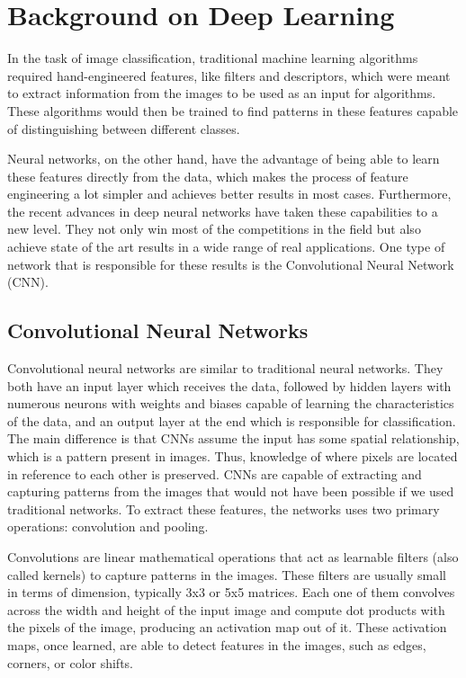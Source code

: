 \chapter{Background on Deep Learning}

In the task of image classification, traditional machine learning algorithms required hand-engineered features, like filters and descriptors, which were meant to extract information from the images to be used as an input for algorithms. These algorithms would then be trained to find patterns in these features capable of distinguishing between different classes.

Neural networks, on the other hand, have the advantage of being able to learn these features directly from the data, which makes the process of feature engineering a lot simpler and achieves better results in most cases. Furthermore, the recent advances in deep neural networks have taken these capabilities to a new level. They not only win most of the competitions in the field but also achieve state of the art results in a wide range of real applications. One type of network that is responsible for these results is the Convolutional Neural Network (CNN).

\section{Convolutional Neural Networks}

Convolutional neural networks are similar to traditional neural networks. They both have an input layer which receives the data, followed by hidden layers with numerous neurons with weights and biases capable of learning the characteristics of the data, and an output layer at the end which is responsible for classification. The main difference is that CNNs assume the input has some spatial relationship, which is a pattern present in images. Thus, knowledge of where pixels are located in reference to each other is preserved. CNNs are capable of extracting and capturing patterns from the images that would not have been possible if we used traditional networks. To extract these features, the networks uses two primary operations: convolution and pooling.

Convolutions are linear mathematical operations that act as learnable filters (also called kernels) to capture patterns in the images. These filters are usually small in terms of dimension, typically 3x3 or 5x5 matrices. Each one of them convolves across the width and height of the input image and compute dot products with the pixels of the image, producing an activation map out of it. These activation maps, once learned, are able to detect features in the images, such as edges, corners, or color shifts. 

